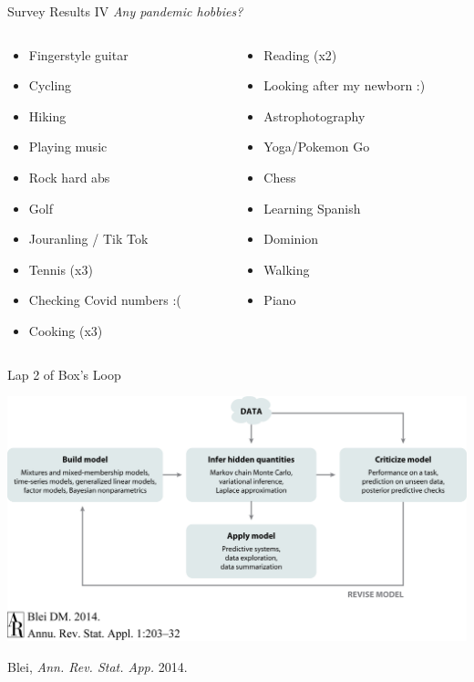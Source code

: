 \documentclass[aspectratio=169]{beamer}
\begin{document}
\begin{frame}{Survey Results IV}
\textit{Any pandemic hobbies?}
\begin{columns}
\begin{column}{.5\textwidth}
\begin{itemize}
    \item Fingerstyle guitar
    \item Cycling
    \item Hiking
    \item Playing music
    \item Rock hard abs
    \item Golf
    \item Jouranling / Tik Tok
    \item Tennis (x3)
    \item Checking Covid numbers :(
    \item Cooking (x3)
\end{itemize}
\end{column}
\begin{column}{.5\textwidth}
\begin{itemize}
    \item Reading (x2)
    \item Looking after my newborn :)
    \item Astrophotography
    \item Yoga/Pokemon Go
    \item Chess
    \item Learning Spanish
    \item Dominion
    \item Walking
    \item Piano
\end{itemize}
\end{column}

\end{columns}
\end{frame}


\begin{frame}{Lap 2 of Box's Loop}
\begin{center}
\includegraphics[width=.85\linewidth]{figures/lap1/boxsloop.jpeg}\\
\end{center} 
\begin{flushright}
{\footnotesize Blei, \textit{Ann. Rev. Stat. App.} 2014.}
\end{flushright}
\end{frame}
\end{document}
